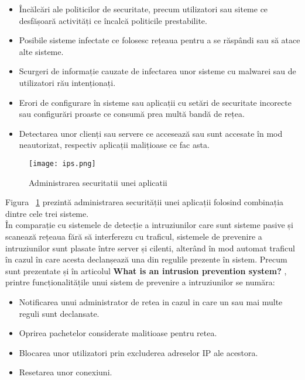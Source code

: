 \begin{itemize}
	\item  Încălcări ale politicilor de securitate, precum utilizatori sau siteme ce desfășoară activități ce încalcă politicile prestabilite. 
	\item  Posibile sisteme infectate ce folosesc rețeaua pentru a se răspândi sau să atace alte sisteme. 
	\item  Scurgeri de informație cauzate de infectarea unor sisteme cu malwarei sau de utilizatori rău intenționați. 
	\item  Erori de configurare în sisteme sau aplicații cu setări de securitate incorecte sau configurări proaste ce consumă prea multă bandă de rețea. 
	\item  Detectarea unor clienți sau servere ce accesează sau sunt accesate în mod neautorizat, respectiv aplicații malițioase ce fac asta. 
\end{itemize}
\begin{figure}[h]
	\centering
	\texttt{[image: ips.png]}
	\caption{Administrarea securitatii unei aplicatii}
	\label{fig:ips-example}
\end{figure}

Figura ~\ref{fig:ips-example}  prezintă administrarea securității unei aplicații folosind combinația dintre cele trei sisteme.  \\

În comparație cu sistemele de detecție a intruziunilor care sunt sisteme pasive și scanează rețeaua fără să interferezu cu traficul, sistemele de prevenire a intruziunilor sunt plasate între server și cilenti, alterând în mod automat traficul în cazul în care acesta declanșează una din regulile prezente în sistem. Precum sunt prezentate și în articolul  \textbf{What is an intrusion prevention system?} \cite{what_is_ips},  printre funcționalitățile unui sistem de prevenire a intruziunilor se număra:
\begin{itemize}
	\item Notificarea unui administrator de retea in cazul in care un sau mai multe reguli sunt declansate.
	\item Oprirea pachetelor considerate malitioase pentru retea.
	\item Blocarea unor utilizatori prin excluderea adreselor IP ale acestora.
	\item Resetarea unor conexiuni.
\end{itemize}

